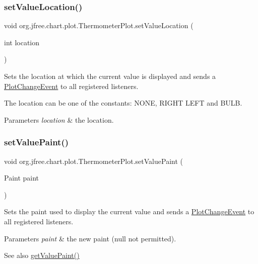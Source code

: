 \subsubsection{\texorpdfstring{set\+Value\+Location()}{setValueLocation()}}
{\footnotesize\ttfamily void org.\+jfree.\+chart.\+plot.\+Thermometer\+Plot.\+set\+Value\+Location (\begin{DoxyParamCaption}\item[{int}]{location }\end{DoxyParamCaption})}

Sets the location at which the current value is displayed and sends a \mbox{\hyperlink{}{Plot\+Change\+Event}} to all registered listeners. 

The location can be one of the constants\+: {\ttfamily N\+O\+NE}, {\ttfamily R\+I\+G\+HT} {\ttfamily L\+E\+FT} and {\ttfamily B\+U\+LB}.


\begin{DoxyParams}{Parameters}
{\em location} & the location. \\
\hline
\end{DoxyParams}
\mbox{\label{classorg_1_1jfree_1_1chart_1_1plot_1_1_thermometer_plot_a347f5e5511e843c2e496019c84c20fd9}} 
\subsubsection{\texorpdfstring{set\+Value\+Paint()}{setValuePaint()}}
{\footnotesize\ttfamily void org.\+jfree.\+chart.\+plot.\+Thermometer\+Plot.\+set\+Value\+Paint (\begin{DoxyParamCaption}\item[{Paint}]{paint }\end{DoxyParamCaption})}

Sets the paint used to display the current value and sends a \mbox{\hyperlink{}{Plot\+Change\+Event}} to all registered listeners.


\begin{DoxyParams}{Parameters}
{\em paint} & the new paint ({\ttfamily null} not permitted).\\
\hline
\end{DoxyParams}
\begin{DoxySeeAlso}{See also}
\mbox{\hyperlink{classorg_1_1jfree_1_1chart_1_1plot_1_1_thermometer_plot_ae4d7d0cbb2ce0a352a3855c3fa959eb4}{get\+Value\+Paint()}} 
\end{DoxySeeAlso}
\mbox{\label{classorg_1_1jfree_1_1chart_1_1plot_1_1_thermometer_plot_a50925b54c9d1e3ca80edd9d03969d00d}} 
